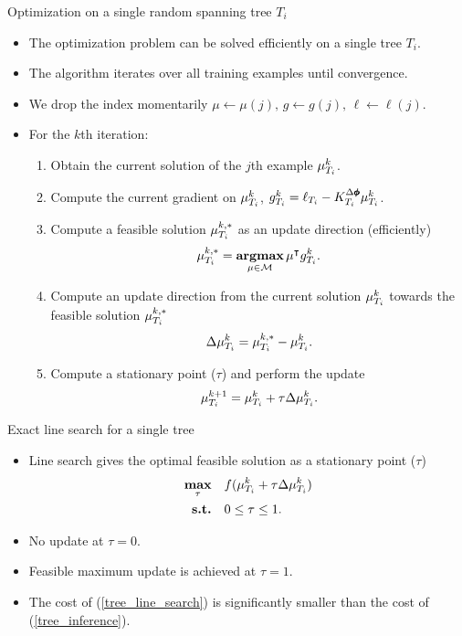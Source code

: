 \documentclass[first=dgreen,second=purple,logo=yellowexc]{aaltoslides}
\begin{document}
\begin{frame}{Optimization on a single random spanning tree $T_i$}
	\begin{itemize}\footnotesize
		\item The optimization problem can be solved efficiently on a single tree $T_i$. 
		\item The algorithm iterates over all training examples until convergence.
		\item We drop the index momentarily $\mu\leftarrow\mu(j),\,g\leftarrow g(j),\,\ell\leftarrow\ell(j)$.
		\item For the $k$th iteration:
		\begin{enumerate}\footnotesize
			\item Obtain the current solution of the $j$th example $\mathbf {\mu}_{T_i}^k$.
			\item Compute the current gradient on $\mathbf {\mu}_{T_i}^k$, $g_{T_i}^k = \ell_{T_i} - K^{\Delta\pmb \phi}_{T_i}\mathbf {\mu}_{T_i}^k$.
			\item Compute a feasible solution ${\mathbf {\mu}}_{T_i}^{k,*}$ as an update direction ({\color{aaltored}efficiently})
			\begin{align}
				{\mathbf {\mu}}_{T_i}^{k,*} = \underset{\mathbf {\mu}\in\mathcal{M}}{\textbf{argmax}}\,\mathbf {\mu}^{\intercal} g_{T_i}^k. \label{tree_inference}
			\end{align}
			\item Compute an update direction from the current solution ${\mathbf {\mu}}_{T_i}^{k}$ towards the feasible solution ${\mathbf {\mu}}_{T_i}^{k,*}$
			\begin{align*}
				\Delta\mathbf {\mu}_{T_i}^{k} = {\mathbf {\mu}}_{T_i}^{k,*} - {\mathbf {\mu}}_{T_i}^{k}.
			\end{align*}
			\item Compute a stationary point ($\tau$) and perform the update
			\begin{align*}
				\mathbf {\mu}_{T_i}^{k+1} = \mathbf {\mu}_{T_i}^k + \tau\Delta\mathbf {\mu}_{T_i}^{k}.
			\end{align*}
		\end{enumerate}
	\end{itemize}
\end{frame}

\begin{frame}{Exact line search for a single tree}
	\begin{itemize}
		\item Line search gives the optimal feasible solution as a stationary point ($\tau$)
		\begin{align}
			\underset{\tau}{\textbf{max}} &\quad f(\mathbf {\mu}_{T_i}^k + \tau\Delta\mathbf {\mu}_{T_i}^{k})\label{tree_line_search}\\
			\textbf{s.t.} &\quad 0\le\tau\le1.\nonumber
		\end{align}
		\item No update at $\tau=0$.
		\item Feasible maximum update is achieved at $\tau=1$. 
		\item The cost of (\ref{tree_line_search}) is significantly smaller than the cost of (\ref{tree_inference}).
	\end{itemize}
\end{frame}
\end{document}
